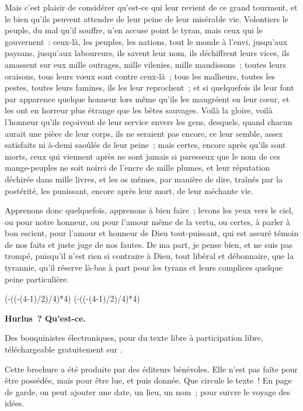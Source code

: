 \documentclass[french,twoside]{book} %
\def\truncdiv#1#2{((#1-(#2-1)/2)/#2)}
\def\moduloop#1#2{(#1-\truncdiv{#1}{#2}*#2)}
\def\modulo#1#2{\number\numexpr\moduloop{#1}{#2}\relax}
\begin{document}
Mais c’est plaisir de considérer qu’est-ce qui leur revient de ce grand tourment, et le bien qu’ils peuvent attendre de leur peine de leur misérable vie. Volontiers le peuple, du mal qu’il souffre, n’en accuse point le tyran, mais ceux qui le gouvernent : ceux-là, les peuples, les nations, tout le monde à l’envi, jusqu’aux paysans, jusqu’aux laboureurs, ils savent leur nom, ils déchiffrent leurs vices, ils amassent sur eux mille outrages, mille vilenies, mille maudissons ; toutes leurs oraisons, tous leurs vœux sont contre ceux-là ; tous les malheurs, toutes les pestes, toutes leurs famines, ils les leur reprochent ; et si quelquefois ils leur font par apparence quelque honneur lors même qu’ils les maugréent en leur cœur, et les ont en horreur plus étrange que les bêtes sauvages. Voilà la gloire, voilà l’honneur qu’ils reçoivent de leur service envers les gens, desquels, quand chacun aurait une pièce de leur corps, ils ne seraient pas encore, ce leur semble, assez satisfaits ni à-demi saoûlés de leur peine ; mais certes, encore après qu’ils sont morts, ceux qui viennent après ne sont jamais si paresseux que le nom de ces mange-peuples ne soit noirci de l’encre de mille plumes, et leur réputation déchirée dans mille livres, et les os mêmes, par manière de dire, traînés par la postérité, les punissant, encore après leur mort, de leur méchante vie.\par
Apprenons donc quelquefois, apprenons à bien faire ; levons les yeux vers le ciel, ou pour notre honneur, ou pour l’amour même de la vertu, ou certes, à parler à bon escient, pour l’amour et honneur de Dieu tout-puissant, qui est assuré témoin de nos faits et juste juge de nos fautes. De ma part, je pense bien, et ne suis pas trompé, puisqu’il n’est rien si contraire à Dieu, tout libéral et débonnaire, que la tyrannie, qu’il réserve là-bas à part pour les tyrans et leurs complices quelque peine particulière.
 


\ifbooklet
  \pagestyle{empty}
  \clearpage
  \ifnum\modulo{\value{page}}{4}=0 \hbox{}\newpage\hbox{}\newpage\fi
  \ifnum\modulo{\value{page}}{4}=1 \hbox{}\newpage\hbox{}\newpage\fi


  \hbox{}\newpage
  \ifodd\value{page}\hbox{}\newpage\fi
  {\centering\color{rubric}\bfseries\noindent\large
    Hurlus ? Qu’est-ce.\par
    \bigskip
  }
  \noindent Des bouquinistes électroniques, pour du texte libre à participation libre,
  téléchargeable gratuitement sur \href{https://hurlus.fr}{}.\par
  \bigskip
  \noindent Cette brochure a été produite par des éditeurs bénévoles.
  Elle n’est pas faîte pour être possédée, mais pour être lue, et puis donnée.
  Que circule le texte !
  En page de garde, on peut ajouter une date, un lieu, un nom ; pour suivre le voyage des idées.
  \par
\end{document}
